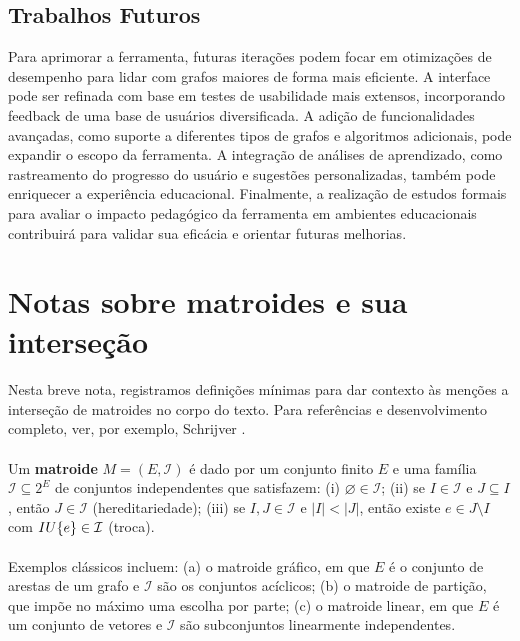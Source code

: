 \documentclass[12pt,a4paper]{article}
\def\emph#1{#1}%
\def\cup{\string U}%
\begin{document}
\subsection{Trabalhos Futuros}
Para aprimorar a ferramenta, futuras iterações podem focar em otimizações de desempenho para lidar com grafos maiores de forma mais eficiente. A interface pode ser refinada com base em testes de usabilidade mais extensos, incorporando feedback de uma base de usuários diversificada. A adição de funcionalidades avançadas, como suporte a diferentes tipos de grafos e algoritmos adicionais, pode expandir o escopo da ferramenta. A integração de análises de aprendizado, como rastreamento do progresso do usuário e sugestões personalizadas, também pode enriquecer a experiência educacional. Finalmente, a realização de estudos formais para avaliar o impacto pedagógico da ferramenta em ambientes educacionais contribuirá para validar sua eficácia e orientar futuras melhorias.

\clearpage
\appendix

\section{Notas sobre matroides e sua interseção}
\label{ap:matroides}

\paragraph{}
Nesta breve nota, registramos definições mínimas para dar contexto às menções a interseção de matroides no corpo do texto. Para referências e desenvolvimento completo, ver, por exemplo, Schrijver \cite{schrijver2003comb}.

\paragraph{}
Um \textbf{matroide} $M=(E,\mathcal{I})$ é dado por um conjunto finito $E$ e uma família $\mathcal{I}\subseteq 2^{E}$ de conjuntos \emph{independentes} que satisfazem: (i) $\varnothing\in\mathcal{I}$; (ii) se $I\in\mathcal{I}$ e $J\subseteq I$, então $J\in\mathcal{I}$ (hereditariedade); (iii) se $I,J\in\mathcal{I}$ e $|I|<|J|$, então existe $e\in J\setminus I$ com $I\cup\{e\}\in\mathcal{I}$ (troca).

\paragraph{}
Exemplos clássicos incluem: (a) o matroide gráfico, em que $E$ é o conjunto de arestas de um grafo e $\mathcal{I}$ são os conjuntos acíclicos; (b) o matroide de partição, que impõe no máximo uma escolha por parte; (c) o matroide linear, em que $E$ é um conjunto de vetores e $\mathcal{I}$ são subconjuntos linearmente independentes.
\end{document}
